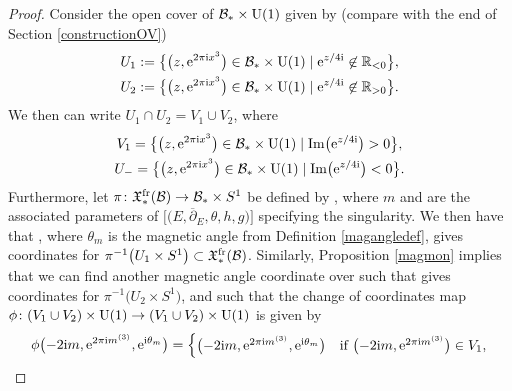 \begin{proof}
Consider the open cover of $\mathcal{B}_*\times {\rm U}(1)$ given by (compare with the end of Section \ref{constructionOV})
\begin{gather*}
 U_1:=\bigl\{\bigl(z,{\rm e}^{2\pi{\rm i}x^{3}}\bigr) \in \mathcal{B}_*\times {\rm U}(1) \mid {\rm e}^{z/4{\rm i}}\not\in \mathbb{R}_{<0} \bigr\}, \\
 U_2:=\bigl\{\bigl(z,{\rm e}^{2\pi{\rm i}x^{3}}\bigr) \in \mathcal{B}_*\times {\rm U}(1) \mid {\rm e}^{z/4{\rm i}}\not\in \mathbb{R}_{>0} \bigr\}.
\end{gather*}
We then can write $U_1\cap U_2= V_1\cup V_2$, where
\begin{gather*}
 V_1=\bigl\{\bigl(z,{\rm e}^{2\pi {\rm i}x^3}\bigr) \in \mathcal{B}_*\times {\rm U}(1) \mid \operatorname{Im}\bigl({\rm e}^{z/4{\rm i}}\bigr)>0\bigr\}, \\
 U_{-}=\bigl\{\bigl(z,{\rm e}^{2\pi {\rm i}x^3}\bigr) \in \mathcal{B}_*\times {\rm U}(1) \mid \operatorname{Im}\bigl({\rm e}^{z/4{\rm i}}\bigr)<0\bigr\}.
\end{gather*}
Furthermore, let $\pi\colon \mathfrak{X}_*^{{\rm fr}}(\mathcal{B}) \to \mathcal{B}_*\times S^1$ be defined by , where $m$ and  are the associated parameters of $\bigl[\bigl(E,\overline{\partial}_E,\theta,h,g\bigr)\bigr]$ specifying the singularity. We then have that , where $\theta_m$ is the magnetic angle from Definition \ref{magangledef}, gives coordinates for $\pi^{-1}\bigl(U_1\times S^1\bigr)\subset \mathfrak{X}_*^{{\rm fr}}(\mathcal{B})$. Similarly, Proposition \ref{magmon} implies that we can find another magnetic angle coordinate  over  such that  gives coordinates for $\pi^{-1}\bigl(U_2\times S^1\bigr)$, and such that the change of coordinates map $\phi\colon (V_1\cup V_2)\times {\rm U}(1) \to (V_1\cup V_2)\times {\rm U}(1)$ is given by
\begin{equation*}
 \phi\bigl(-2{\rm i}m,{\rm e}^{2\pi {\rm i} m^{(3)}},{\rm e}^{{\rm i}\theta_m}\bigr)=\begin{cases}
 \bigl(-2{\rm i}m,{\rm e}^{2\pi {\rm i} m^{(3)}},{\rm e}^{{\rm i}\theta_m}\bigr)& \text{if} \ \bigl(-2{\rm i}m,{\rm e}^{2\pi {\rm i} m^{(3)}}\bigr) \in V_1,\\

\end{cases}
\end{equation*}
\end{proof}
